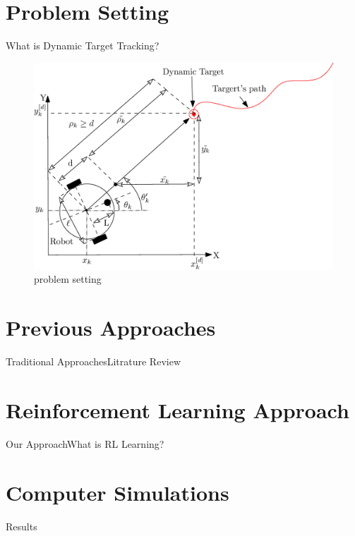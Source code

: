 \documentclass{beamer}
\begin{document}
\section{Problem Setting}
\begin{frame}{What is Dynamic Target Tracking?}
\begin{center}
\begin{figure}
\includegraphics[scale=0.3]{figs/ipe/LFMICSetup.eps}
\caption{problem setting}
\end{figure}
\end{center}
\end{frame}
%

\section{Previous Approaches}
\begin{frame}{Traditional Approaches}{Litrature Review}
\
\end{frame}
\section{Reinforcement Learning Approach}
\begin{frame}{Our Approach}{What is RL Learning?}

\end{frame}

\section{Computer Simulations}
\begin{frame}{Results}

\end{frame}
\end{document}
